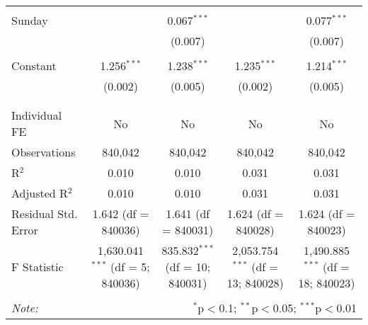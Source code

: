 \documentclass[
]{article}
\begin{document}
\begin{table}[!htbp]
{\begin{tabular}{@{\extracolsep{5pt}}lcccc}
  & & & & \\ 
 Sunday &  & 0.067$^{***}$ &  & 0.077$^{***}$ \\ 
  &  & (0.007) &  & (0.007) \\ 
  & & & & \\ 
 Constant & 1.256$^{***}$ & 1.238$^{***}$ & 1.235$^{***}$ & 1.214$^{***}$ \\ 
  & (0.002) & (0.005) & (0.002) & (0.005) \\ 
  & & & & \\ 
\hline \\[-1.8ex] 
Individual FE & No & No & No & No \\ 
Observations & 840,042 & 840,042 & 840,042 & 840,042 \\ 
R$^{2}$ & 0.010 & 0.010 & 0.031 & 0.031 \\ 
Adjusted R$^{2}$ & 0.010 & 0.010 & 0.031 & 0.031 \\ 
Residual Std. Error & 1.642 (df = 840036) & 1.641 (df = 840031) & 1.624 (df = 840028) & 1.624 (df = 840023) \\ 
F Statistic & 1,630.041$^{***}$ (df = 5; 840036) & 835.832$^{***}$ (df = 10; 840031) & 2,053.754$^{***}$ (df = 13; 840028) & 1,490.885$^{***}$ (df = 18; 840023) \\ 
\hline 
\hline \\[-1.8ex] 
\textit{Note:}  & \multicolumn{4}{r}{$^{*}$p$<$0.1; $^{**}$p$<$0.05; $^{***}$p$<$0.01} \\ 
\end{tabular}
} 
\end{table} 
\newpage
\end{document}
